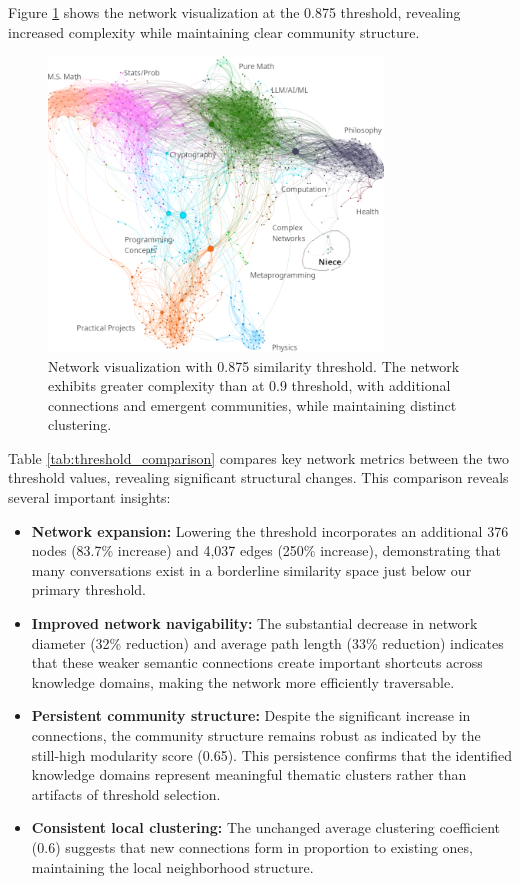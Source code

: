 \documentclass[10pt, a4paper]{article}
\begin{document}
Figure \ref{fig:threshold_comparison} shows the network visualization at the 0.875 threshold, revealing increased complexity while maintaining clear community structure.

\begin{figure}
\centering
\includegraphics[width=3.5in]{./images/0.875-wild-better.png}
\caption{Network visualization with 0.875 similarity threshold. The network exhibits greater complexity than at 0.9 threshold, with additional connections and emergent communities, while maintaining distinct clustering.}
\label{fig:threshold_comparison}
\end{figure}

Table \ref{tab:threshold_comparison} compares key network metrics between the two threshold values, revealing significant structural changes. This comparison reveals several important insights:

\begin{itemize}
    \item \textbf{Network expansion:} Lowering the threshold incorporates an additional 376 nodes (83.7\% increase) and 4,037 edges (250\% increase), demonstrating that many conversations exist in a borderline similarity space just below our primary threshold.
    
    \item \textbf{Improved network navigability:} The substantial decrease in network diameter (32\% reduction) and average path length (33\% reduction) indicates that these weaker semantic connections create important shortcuts across knowledge domains, making the network more efficiently traversable.
    
    \item \textbf{Persistent community structure:} Despite the significant increase in connections, the community structure remains robust as indicated by the still-high modularity score (0.65). This persistence confirms that the identified knowledge domains represent meaningful thematic clusters rather than artifacts of threshold selection.
    
    \item \textbf{Consistent local clustering:} The unchanged average clustering coefficient (0.6) suggests that new connections form in proportion to existing ones, maintaining the local neighborhood structure.
\end{itemize}
\end{document}
